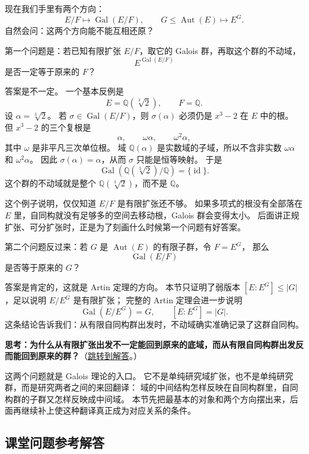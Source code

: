 现在我们手里有两个方向：
\[
E/F \longmapsto \operatorname{Gal}(E/F),
\qquad
G\leq\operatorname{Aut}(E) \longmapsto E^G.
\]
自然会问：这两个方向能不能互相还原？

第一个问题是：若已知有限扩张 $E/F$，取它的 Galois 群，再取这个群的不动域，
\[
E^{\operatorname{Gal}(E/F)}
\]
是否一定等于原来的 $F$？

答案是不一定。
一个基本反例是
\[
E=\mathbb{Q}(\sqrt[3]{2}),\qquad F=\mathbb{Q}.
\]
设 $\alpha=\sqrt[3]{2}$。
若 $\sigma\in\operatorname{Gal}(E/F)$，则 $\sigma(\alpha)$ 必须仍是 $x^3-2$ 在 $E$ 中的根。
但 $x^3-2$ 的三个复根是
\[
\alpha,\qquad \omega\alpha,\qquad \omega^2\alpha,
\]
其中 $\omega$ 是非平凡三次单位根。
域 $\mathbb{Q}(\alpha)$ 是实数域的子域，所以不含非实数 $\omega\alpha$ 和 $\omega^2\alpha$。
因此 $\sigma(\alpha)=\alpha$，从而 $\sigma$ 只能是恒等映射。
于是
\[
\operatorname{Gal}(\mathbb{Q}(\sqrt[3]{2})/\mathbb{Q})
=\{\operatorname{id}\}.
\]
这个群的不动域就是整个 $\mathbb{Q}(\sqrt[3]{2})$，而不是 $\mathbb{Q}$。

这个例子说明，仅仅知道 $E/F$ 是有限扩张还不够。
如果多项式的根没有全部落在 $E$ 里，自同构就没有足够多的空间去移动根，Galois 群会变得太小。
后面讲正规扩张、可分扩张时，正是为了刻画什么时候第一个问题有好答案。

第二个问题反过来：若 $G$ 是 $\operatorname{Aut}(E)$ 的有限子群，令 $F=E^G$，
那么
\[
\operatorname{Gal}(E/F)
\]
是否等于原来的 $G$？

答案是肯定的，这就是 Artin 定理的方向。
本节只证明了弱版本 $[E:E^G]\leq |G|$，足以说明 $E/E^G$ 是有限扩张；
完整的 Artin 定理会进一步说明
\[
\operatorname{Gal}(E/E^G)=G,\qquad [E:E^G]=|G|.
\]
这条结论告诉我们：从有限自同构群出发时，不动域确实准确记录了这群自同构。

\hypertarget{q:galois-two-directions}{}
\medskip
\noindent\textbf{思考：为什么从有限扩张出发不一定能回到原来的底域，而从有限自同构群出发反而能回到原来的群？}（\hyperlink{ans:galois-two-directions}{跳转到解答}。）
\medskip

这两个问题就是 Galois 理论的入口。
它不是单纯研究域扩张，也不是单纯研究群，而是研究两者之间的来回翻译：
域的中间结构怎样反映在自同构群里，自同构群的子群又怎样反映成中间域。
本节先把最基本的对象和两个方向摆出来，后面再继续补上使这种翻译真正成为对应关系的条件。

\subsection*{课堂问题参考解答}

